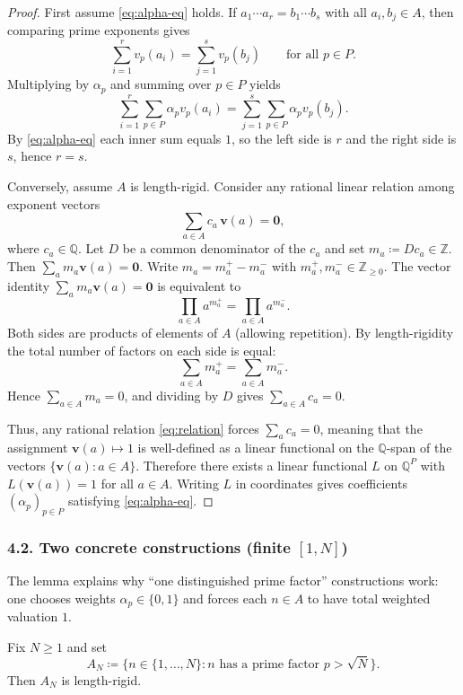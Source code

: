 \begin{proof}
First assume \eqref{eq:alpha-eq} holds. If $a_1\cdots a_r=b_1\cdots b_s$ with all $a_i,b_j\in A$, then comparing prime exponents gives
\[
\sum_{i=1}^r v_p(a_i)=\sum_{j=1}^s v_p(b_j)\qquad\text{for all }p\in P.
\]
Multiplying by $\alpha_p$ and summing over $p\in P$ yields
\[
\sum_{i=1}^r \sum_{p\in P} \alpha_p v_p(a_i)
=
\sum_{j=1}^s \sum_{p\in P} \alpha_p v_p(b_j).
\]
By \eqref{eq:alpha-eq} each inner sum equals $1$, so the left side is $r$ and the right side is $s$, hence $r=s$.

\medskip
Conversely, assume $A$ is length-rigid. Consider any rational linear relation among exponent vectors
\begin{equation}
\label{eq:relation}
\sum_{a\in A} c_a\,\mathbf v(a)=\mathbf 0,
\end{equation}
where $c_a\in\mathbb{Q}$. Let $D$ be a common denominator of the $c_a$ and set $m_a\coloneqq Dc_a\in\mathbb{Z}$. Then
$\sum_a m_a\mathbf v(a)=\mathbf 0$. Write $m_a=m_a^+-m_a^-$ with $m_a^+,m_a^-\in\mathbb{Z}_{\ge0}$.
The vector identity $\sum_a m_a\mathbf v(a)=\mathbf 0$ is equivalent to
\[
\prod_{a\in A} a^{m_a^+}=\prod_{a\in A} a^{m_a^-}.
\]
Both sides are products of elements of $A$ (allowing repetition). By length-rigidity the total number of factors on each side is equal:
\[
\sum_{a\in A} m_a^+=\sum_{a\in A} m_a^-.
\]
Hence $\sum_{a\in A} m_a=0$, and dividing by $D$ gives $\sum_{a\in A} c_a=0$.

Thus, any rational relation \eqref{eq:relation} forces $\sum_a c_a=0$, meaning that the assignment $\mathbf v(a)\mapsto 1$ is well-defined as a linear functional on the $\mathbb{Q}$-span of the vectors $\{\mathbf v(a):a\in A\}$. Therefore there exists a linear functional $L$ on $\mathbb{Q}^P$ with $L(\mathbf v(a))=1$ for all $a\in A$. Writing $L$ in coordinates gives coefficients $(\alpha_p)_{p\in P}$ satisfying \eqref{eq:alpha-eq}.
\end{proof}

\subsubsection*{4.2. Two concrete constructions (finite $[1,N]$)}
The lemma explains why ``one distinguished prime factor'' constructions work: one chooses weights $\alpha_p\in\{0,1\}$ and forces each $n\in A$ to have total weighted valuation $1$.

\begin{proposition}
Fix $N\ge 1$ and set
\[
A_N\coloneqq\{n\in\{1,\dots,N\}: \text{$n$ has a prime factor $p>\sqrt N$}\}.
\]
Then $A_N$ is length-rigid.
\end{proposition}

